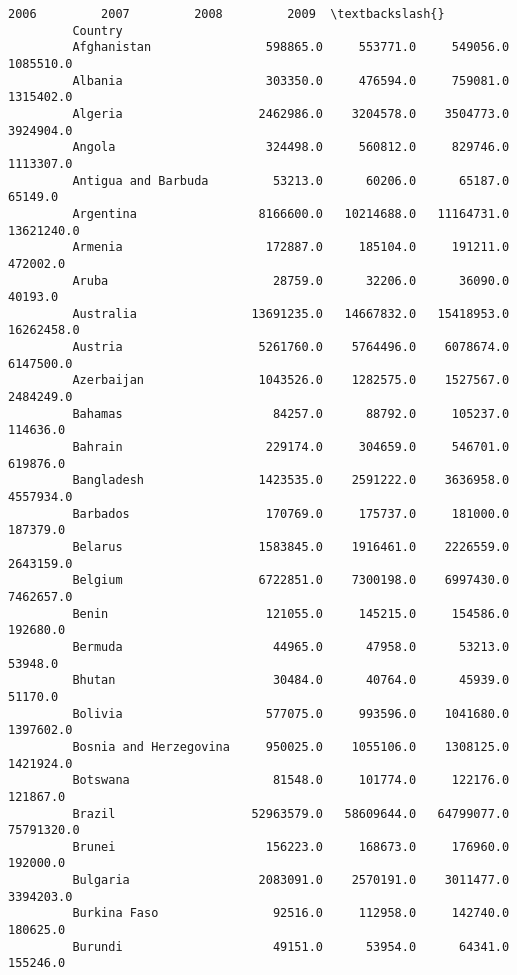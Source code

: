 \documentclass[11pt]{article}
\begin{document}
\begin{Verbatim}[commandchars=\\\{\}]
                                        2006         2007         2008         2009  \textbackslash{}
         Country                                                                      
         Afghanistan                598865.0     553771.0     549056.0    1085510.0   
         Albania                    303350.0     476594.0     759081.0    1315402.0   
         Algeria                   2462986.0    3204578.0    3504773.0    3924904.0   
         Angola                     324498.0     560812.0     829746.0    1113307.0   
         Antigua and Barbuda         53213.0      60206.0      65187.0      65149.0   
         Argentina                 8166600.0   10214688.0   11164731.0   13621240.0   
         Armenia                    172887.0     185104.0     191211.0     472002.0   
         Aruba                       28759.0      32206.0      36090.0      40193.0   
         Australia                13691235.0   14667832.0   15418953.0   16262458.0   
         Austria                   5261760.0    5764496.0    6078674.0    6147500.0   
         Azerbaijan                1043526.0    1282575.0    1527567.0    2484249.0   
         Bahamas                     84257.0      88792.0     105237.0     114636.0   
         Bahrain                    229174.0     304659.0     546701.0     619876.0   
         Bangladesh                1423535.0    2591222.0    3636958.0    4557934.0   
         Barbados                   170769.0     175737.0     181000.0     187379.0   
         Belarus                   1583845.0    1916461.0    2226559.0    2643159.0   
         Belgium                   6722851.0    7300198.0    6997430.0    7462657.0   
         Benin                      121055.0     145215.0     154586.0     192680.0   
         Bermuda                     44965.0      47958.0      53213.0      53948.0   
         Bhutan                      30484.0      40764.0      45939.0      51170.0   
         Bolivia                    577075.0     993596.0    1041680.0    1397602.0   
         Bosnia and Herzegovina     950025.0    1055106.0    1308125.0    1421924.0   
         Botswana                    81548.0     101774.0     122176.0     121867.0   
         Brazil                   52963579.0   58609644.0   64799077.0   75791320.0   
         Brunei                     156223.0     168673.0     176960.0     192000.0   
         Bulgaria                  2083091.0    2570191.0    3011477.0    3394203.0   
         Burkina Faso                92516.0     112958.0     142740.0     180625.0   
         Burundi                     49151.0      53954.0      64341.0     155246.0   

\end{Verbatim}
\end{document}
